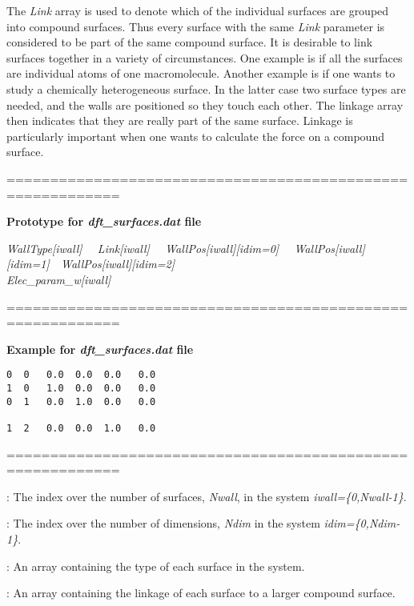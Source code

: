\documentclass[10pt,onecolumn]{article}
\begin{document}
The {\it Link} array is used to denote which of the individual surfaces are grouped into compound surfaces.  Thus every surface with the same {\it Link} parameter is considered to be part of the same compound surface.
It is desirable to link surfaces together in a variety of
circumstances.  One example is if all the surfaces are individual
atoms of one macromolecule.  Another example is if one wants to
study a chemically heterogeneous surface.  In the latter case two
surface types are needed, and the walls are positioned so they
touch each other.  The linkage array then indicates that they are
really part of the same surface.  Linkage is particularly
important when one wants to calculate the force on a compound
surface.

\vspace{0.1in}
\noindent===========================================================

{\bf Prototype for {\it dft\_surfaces.dat} file}

{\it WallType[iwall] \ \ Link[iwall] \ \ WallPos[iwall][idim=0] \ \
WallPos[iwall][idim=1]\ \ WallPos[iwall][idim=2] \\Elec\_param\_w[iwall]}

\noindent===========================================================

{\bf Example for {\it dft\_surfaces.dat} file}

\begin{verbatim}
0  0   0.0  0.0  0.0   0.0
1  0   1.0  0.0  0.0   0.0
0  1   0.0  1.0  0.0   0.0

1  2   0.0  0.0  1.0   0.0
\end{verbatim}

\noindent===========================================================
\vspace{0.1in}


\vspace{0.1in}
: The index over the number of surfaces, {\it Nwall}, in the system
{\it iwall=\{0,Nwall-1\}}.

\vspace{0.1in}
: The index over the number of dimensions, {\it Ndim} in the system
{\it idim=\{0,Ndim-1\}}.

\vspace{0.1in}
: An array containing the type of each surface in the system.

\vspace{0.1in}
:  An array containing the linkage of each surface to a
larger compound surface.
\end{document}
